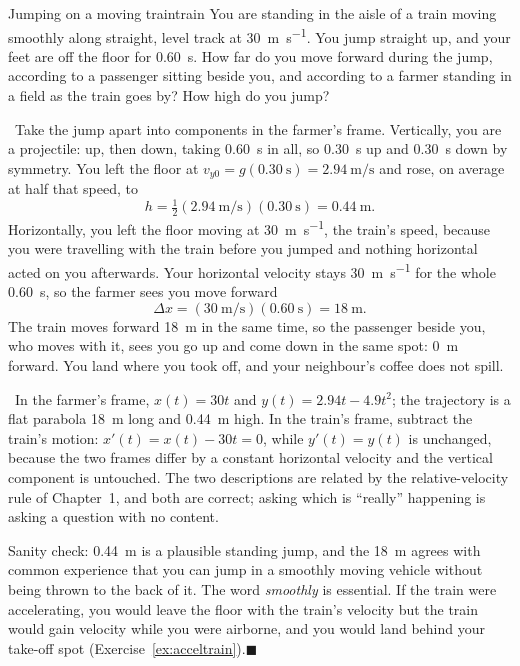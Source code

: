 \documentclass[11pt,twoside,openany]{book}
\newcounter{check}[chapter]
\newcommand{\viewtag}[3]{\fcolorbox{#2}{#3}{\footnotesize\textbf{\textcolor{#2}{#1}}}}
\newcommand{\elemtag}{\viewtag{Elementary}{elemcol}{elempale}}
\newcommand{\calctag}{\viewtag{Calculus}{calccol}{calcpale}}
\newcommand{\elem}{\par\medskip\noindent\elemtag\ }
\newcommand{\calc}{\par\medskip\noindent\calctag\ }
\newcommand{\qed}{\hfill$\blacksquare$}
\begin{document}
\begin{example}{Jumping on a moving train}{train}
You are standing in the aisle of a train moving smoothly along straight, level track at \SI{30}{\metre\per\second}. You jump straight up, and your feet are off the floor for \SI{0.60}{\second}. How far do you move forward during the jump, according to a passenger sitting beside you, and according to a farmer standing in a field as the train goes by? How high do you jump?

\elem Take the jump apart into components in the farmer's frame. Vertically, you are a projectile: up, then down, taking \SI{0.60}{\second} in all, so \SI{0.30}{\second} up and \SI{0.30}{\second} down by symmetry. You left the floor at $v_{y0} = g(\SI{0.30}{\second}) = \SI{2.94}{\metre\per\second}$ and rose, on average at half that speed, to
\[
h = \tfrac12(\SI{2.94}{\metre\per\second})(\SI{0.30}{\second}) = \SI{0.44}{\metre}.
\]
Horizontally, you left the floor moving at \SI{30}{\metre\per\second}, the train's speed, because you were travelling with the train before you jumped and nothing horizontal acted on you afterwards. Your horizontal velocity stays \SI{30}{\metre\per\second} for the whole \SI{0.60}{\second}, so the farmer sees you move forward
\[
\Delta x = (\SI{30}{\metre\per\second})(\SI{0.60}{\second}) = \SI{18}{\metre}.
\]
The train moves forward \SI{18}{\metre} in the same time, so the passenger beside you, who moves with it, sees you go up and come down in the same spot: \SI{0}{\metre} forward. You land where you took off, and your neighbour's coffee does not spill.

\calc In the farmer's frame, $x(t) = 30t$ and $y(t) = 2.94t - 4.9t^2$; the trajectory is a flat parabola \SI{18}{\metre} long and \SI{0.44}{\metre} high. In the train's frame, subtract the train's motion: $x'(t) = x(t) - 30t = 0$, while $y'(t) = y(t)$ is unchanged, because the two frames differ by a constant horizontal velocity and the vertical component is untouched. The two descriptions are related by the relative-velocity rule of Chapter~1, and both are correct; asking which is ``really'' happening is asking a question with no content.

Sanity check: \SI{0.44}{\metre} is a plausible standing jump, and the \SI{18}{\metre} agrees with common experience that you can jump in a smoothly moving vehicle without being thrown to the back of it. The word \emph{smoothly} is essential. If the train were accelerating, you would leave the floor with the train's velocity but the train would gain velocity while you were airborne, and you would land behind your take-off spot (Exercise~\ref{ex:acceltrain}).\qed
\end{example}
\end{document}
